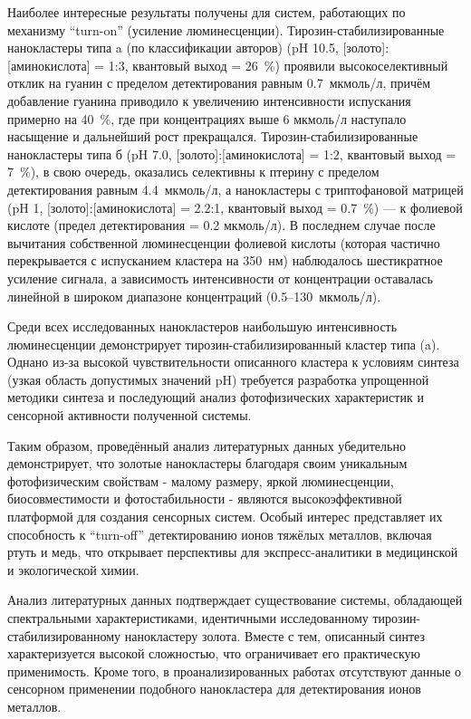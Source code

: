 \documentclass[a4paper, 12pt]{article}
\begin{document}
\begin{onehalfspace}
	Наиболее интересные результаты получены для систем, работающих по механизму \enquote{turn-on} (усиление люминесценции).
	Тирозин-стабилизированные нанокластеры типа a (по классификации авторов) (pH 10.5, [золото]:[аминокислота] = 1:3, квантовый выход = 26~\%) проявили высокоселективный отклик на гуанин с пределом детектирования равным 0.7~мкмоль/л, причём добавление гуанина приводило к увеличению интенсивности испускания примерно на 40~\%, где при концентрациях выше 6 мкмоль/л наступало насыщение и дальнейший рост прекращался.
	Тирозин-стабилизированные нанокластеры типа б (pH 7.0, [золото]:[аминокислота] = 1:2, квантовый выход = 7~\%), в свою очередь, оказались селективны к птерину с пределом детектирования равным 4.4~мкмоль/л, а нанокластеры с триптофановой матрицей (pH 1, [золото]:[аминокислота] = 2.2:1, квантовый выход = 0.7~\%) — к фолиевой кислоте (предел детектирования = 0.2 мкмоль/л).
	В последнем случае после вычитания собственной люминесценции фолиевой кислоты (которая частично перекрывается с испусканием кластера на 350~нм) наблюдалось шестикратное усиление сигнала, а зависимость интенсивности от концентрации оставалась линейной в широком диапазоне концентраций (0.5–130~мкмоль/л).

	Среди всех исследованных нанокластеров наибольшую интенсивность люминесценции демонстрирует тирозин-стабилизированный кластер типа (a).
	Однано из-за высокой чувствительности описанного кластера к условиям синтеза (узкая область допустимых значений pH) требуется разработка упрощенной методики синтеза и последующий анализ фотофизических характеристик и сенсорной активности полученной системы.

	Таким образом, проведённый анализ литературных данных убедительно демонстрирует, что золотые нанокластеры благодаря своим уникальным фотофизическим свойствам - малому размеру, яркой люминесценции, биосовместимости и фотостабильности - являются высокоэффективной платформой для создания сенсорных систем. Особый интерес представляет их способность к \enquote{turn-off} детектированию ионов тяжёлых металлов, включая ртуть и медь, что открывает перспективы для экспресс-аналитики в медицинской и экологической химии.

	Анализ литературных данных подтверждает существование системы, обладающей спектральными характеристиками, идентичными исследованному тирозин-стабилизированному нанокластеру золота. Вместе с тем, описанный синтез характеризуется высокой сложностью, что ограничивает его практическую применимость. Кроме того, в проанализированных работах отсутствуют данные о сенсорном применении подобного нанокластера для детектирования ионов металлов.


\end{onehalfspace}
\end{document}
